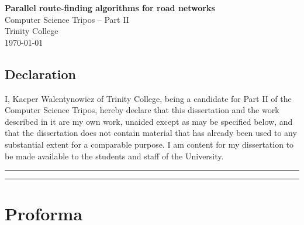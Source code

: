 \documentclass[12pt,a4paper,twoside,openright]{report}
\begin{document}
%




\pagestyle{empty}


\vspace*{60mm}
\begin{center}
\Huge
\textbf{Parallel route-finding algorithms for road networks} \\[5mm]
Computer Science Tripos -- Part II \\[5mm]
Trinity College \\[5mm]
\today  %
\end{center}
\newpage

\pagestyle{plain}
\section*{Declaration}

I, Kacper Walentynowicz of Trinity College, being a candidate for Part II of the Computer Science Tripos, hereby declare that this dissertation and the work described in it are my own work, unaided except as may be specified below, and that the dissertation does not contain material that has already been used to any substantial extent for a comparable purpose. I am content for my dissertation to be made available to the students and staff of the University.

\bigskip
{}
\vspace{20pt}
\par\noindent\rule{\textwidth}{0.4pt}

\medskip
{}
\vspace{20pt}
\par\noindent\rule{\textwidth}{0.4pt}

\chapter*{Proforma}
\end{document}
